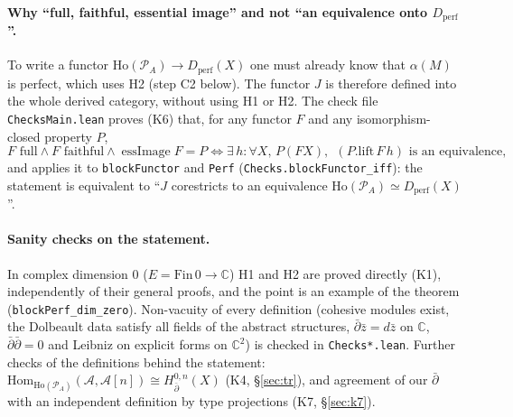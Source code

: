 \documentclass[11pt,a4paper]{article}
\newcommand{\code}[1]{\texttt{#1}}
\newcommand{\cA}{\mathcal{A}}
\newcommand{\dbar}{\bar\partial}
\newcommand{\Ho}{\mathrm{Ho}}
\newcommand{\Dperf}{D_{\mathrm{perf}}}
\newcommand{\Hom}{\mathrm{Hom}}
\begin{document}
\paragraph{Why ``full, faithful, essential image'' and not ``an equivalence onto $\Dperf$''.}
To write a functor $\Ho(\mathcal P_A)\to\Dperf(X)$ one must already know that $\alpha(M)$ is
perfect, which uses H2 (step C2 below). The functor $J$ is therefore defined into the whole
derived category, without using H1 or H2. The check file \code{ChecksMain.lean} proves (K6)
that, for any functor $F$ and any isomorphism-closed property $P$,
\[ F \text{ full} \wedge F\text{ faithful}\wedge \operatorname{essImage}F=P \iff
\exists\, h\colon \forall X,\, P(F X),\ \ (P.\mathrm{lift}\,F\,h) \text{ is an equivalence,} \]
and applies it to \code{blockFunctor} and \code{Perf} (\code{Checks.blockFunctor\_iff}): the
statement is equivalent to ``$J$ corestricts to an equivalence $\Ho(\mathcal P_A)\simeq\Dperf(X)$''.

\paragraph{Sanity checks on the statement.} In complex dimension $0$
($E=\mathrm{Fin}\,0\to\mathbb C$) H1 and H2 are proved directly (K1), independently of their
general proofs, and the point is an example of the theorem (\code{blockPerf\_dim\_zero}).
Non-vacuity of every definition (cohesive modules exist, the Dolbeault data satisfy all fields of
the abstract structures, $\dbar\bar z=d\bar z$ on $\mathbb C$, $\dbar\dbar=0$ and Leibniz on
explicit forms on $\mathbb C^2$) is checked in \code{Checks*.lean}. Further checks of the
definitions behind the statement: $\Hom_{\Ho(\mathcal P_A)}(\cA,\cA[n])\cong H^{0,n}_{\dbar}(X)$
(K4, \S\ref{sec:tr}), and agreement of our $\dbar$ with an independent definition by type
projections (K7, \S\ref{sec:k7}).
\end{document}
